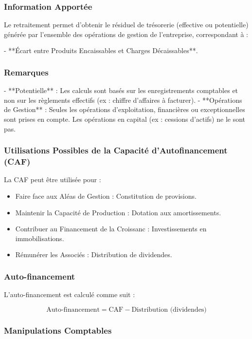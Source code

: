 \documentclass[a4paper, 12pt]{report}
\begin{document}
\subsubsection{Information Apportée}

Le retraitement permet d'obtenir le résiduel de trésorerie (effective ou potentielle) générée par l'ensemble des opérations de gestion de l'entreprise, correspondant à :

- **Écart entre Produits Encaissables et Charges Décaissables**.

\subsubsection{Remarques}

- **Potentielle** : Les calculs sont basés sur les enregistrements comptables et non sur les règlements effectifs (ex : chiffre d'affaires à facturer).
- **Opérations de Gestion** : Seules les opérations d'exploitation, financières ou exceptionnelles sont prises en compte. Les opérations en capital (ex : cessions d'actifs) ne le sont pas.

\subsubsection{Utilisations Possibles de la Capacité d'Autofinancement (CAF)}

La CAF peut être utilisée pour :

\begin{itemize}
	\item Faire face aux Aléas de Gestion : Constitution de provisions.
	\item Maintenir la Capacité de Production : Dotation aux amortissements.
	\item Contribuer au Financement de la Croissanc : Investissements en immobilisations.
	\item Rémunérer les Associés : Distribution de dividendes.
\end{itemize}

\subsubsection{Auto-financement}

L'auto-financement est calculé comme suit :

\[
\text{Auto-financement} = \text{CAF} - \text{Distribution (dividendes)}
\]

\subsubsection{Manipulations Comptables}
\end{document}
